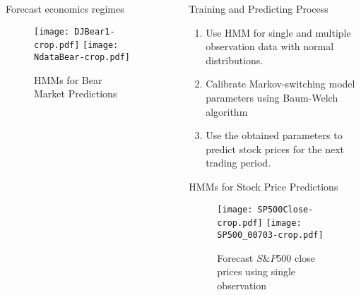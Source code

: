 \documentclass[final]{beamer}
\newlength{\sepwid}
\newlength{\onecolwid}
\begin{document}
\begin{frame}[t]
\begin{columns}[t]
\begin{column}{\onecolwid}
\begin{block}{Forecast economics regimes}
\begin{enumerate}
\end{enumerate}
\begin{figure}[ht]
\begin{center}
  \texttt{[image: DJBear1-crop.pdf]}
   \texttt{[image: NdataBear-crop.pdf]}
\caption{HMMs for Bear Market Predictions}\label{Par}
\end{center}
\end{figure}
\end{block}
\end{column}
\begin{column}{\sepwid}\end{column}			

    \begin{column}{\onecolwid}
\begin{block}{Training and Predicting Process}
 \begin{enumerate}
 \item Use HMM for single and multiple observation data with normal distributions.

 \item Calibrate Markov-switching model parameters using Baum-Welch algorithm

 \item Use the obtained parameters to predict stock prices for the next trading period.
 \end{enumerate}
\end{block}
   \begin{block}{HMMs for Stock Price Predictions}
\begin{figure}[ht]
\begin{center}
    \texttt{[image: SP500Close-crop.pdf]}
    \texttt{[image: SP500\_00703-crop.pdf]}
\caption{Forecast $S\& P 500 $ close prices using single observation}
\end{center}
\end{figure}


\end{block}
\end{column}
\end{columns}
\end{frame}
\end{document}
